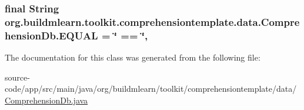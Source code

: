 \subsubsection[{\texorpdfstring{E\+Q\+U\+AL}{EQUAL}}]{\setlength{\rightskip}{0pt plus 5cm}final String org.\+buildmlearn.\+toolkit.\+comprehensiontemplate.\+data.\+Comprehension\+Db.\+E\+Q\+U\+AL = \char`\"{} == \char`\"{}\hspace{0.3cm}{\ttfamily [static]}, {\ttfamily [private]}}\hypertarget{classorg_1_1buildmlearn_1_1toolkit_1_1comprehensiontemplate_1_1data_1_1ComprehensionDb_a3999082d158a860481de440fabe964af}{}\label{classorg_1_1buildmlearn_1_1toolkit_1_1comprehensiontemplate_1_1data_1_1ComprehensionDb_a3999082d158a860481de440fabe964af}


The documentation for this class was generated from the following file\+:\begin{DoxyCompactItemize}
\item 
source-\/code/app/src/main/java/org/buildmlearn/toolkit/comprehensiontemplate/data/\hyperlink{ComprehensionDb_8java}{Comprehension\+Db.\+java}\end{DoxyCompactItemize}
